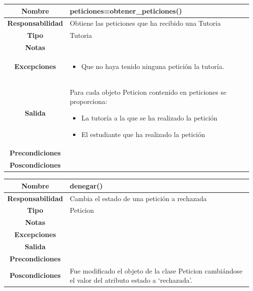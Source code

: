  
               \begin{table}[!ht]
\begin{tabular}{|c|m{10cm}|}
\hline\rowcolor{Gray}
{\bf Nombre } & {peticiones=obtener\_peticiones()}\\
\hline
{\bf Responsabilidad } & {Obtiene las peticiones que ha recibido una Tutoria}\\
\hline
\rowcolor{Gray}
{\bf Tipo } & {Tutoria} \\
\hline
{\bf Notas } & { } \\
\hline
\rowcolor{Gray}
{\bf Excepciones }& {
\begin{itemize}
\item Que no haya tenido ninguna petición la tutoría.
\end{itemize}
} \\
\hline
{\bf Salida }& 

	  { 	
	  Para cada objeto Peticion contenido en peticiones se proporciona:
	  \begin{itemize}
	  \item La tutoría a la que se ha realizado la petición
	  \item El estudiante que ha realizado la petición
	  \end{itemize}
	  } 


 \\
\hline
\rowcolor{Gray}
{\bf Precondiciones }& {}\\
\hline
{\bf Poscondiciones }& {
}  \\
\hline
\end{tabular}

\end{table}    
    
    
    
    
    
    
                  \begin{table}[!ht]
\begin{tabular}{|c|m{10cm}|}
\hline\rowcolor{Gray}
{\bf Nombre } & {denegar()}\\
\hline
{\bf Responsabilidad } & {Cambia el estado de  una petición a rechazada}\\
\hline
\rowcolor{Gray}
{\bf Tipo } & {Peticion} \\
\hline
{\bf Notas } & { } \\
\hline
\rowcolor{Gray}
{\bf Excepciones }& {

} \\
\hline
{\bf Salida }& 
	  { 	

	  } 
 \\
\hline
\rowcolor{Gray}
{\bf Precondiciones }& {}\\
\hline
{\bf Poscondiciones }& { Fue modificado el objeto de la clase Peticion cambiándose el valor del atributo estado a \enquote*{rechazada}.
}  \\
\hline
\end{tabular}

\end{table} 
    
